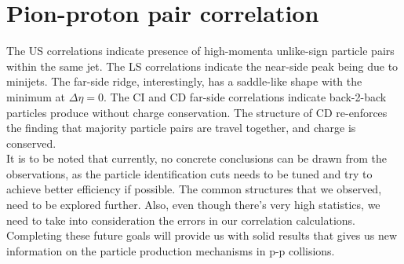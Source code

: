 \documentclass[12pt,a4paper,twoside]{report}
\begin{document}
\section{Pion-proton pair correlation}
The US correlations indicate presence of high-momenta unlike-sign particle pairs within the same jet. The LS correlations indicate the near-side peak being due to minijets. The far-side ridge, interestingly, has a saddle-like shape with the minimum at $\Delta\eta=0$. The CI and CD far-side correlations indicate back-2-back particles produce without charge conservation. The structure of CD re-enforces the finding that majority particle pairs are travel together, and charge is conserved.\\

It is to be noted that currently, no concrete conclusions can be drawn from the observations, as the particle identification cuts needs to be tuned and try to achieve better efficiency if possible. The common structures that we observed, need to be explored further. Also, even though there's very high statistics, we need to take into consideration the errors in our correlation calculations. Completing these future goals will provide us with solid results that gives us new information on the particle production mechanisms in p-p collisions.

\end{document}
